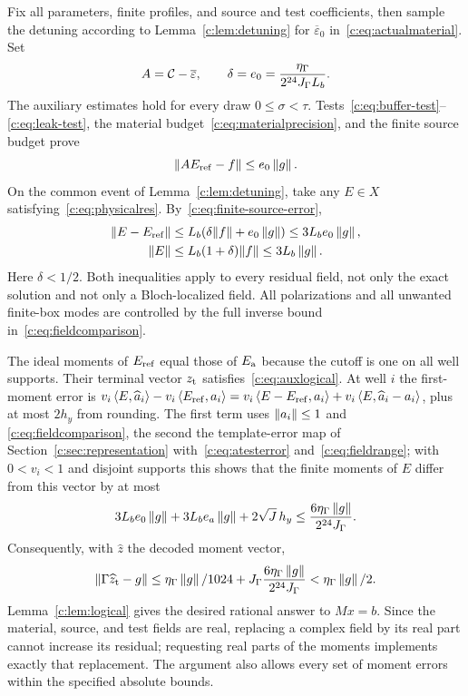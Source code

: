 Fix all parameters, finite profiles, and source and test coefficients,
then sample the detuning according to Lemma~\ref{c:lem:detuning} for
$\overline\varepsilon_0$ in~\eqref{c:eq:actualmaterial}. Set
\begin{equation}
 A=\mathcal C-\overline\varepsilon,
 \qquad \delta=e_0=\frac{\eta_\Gamma}{2^{24}J_\Gamma L_b}.
                                                               \label{c:eq:finaldelta}
\end{equation}
The auxiliary estimates hold for every draw $0\le\sigma<\tau$.
Tests~\eqref{c:eq:buffer-test}--\eqref{c:eq:leak-test}, the material
budget~\eqref{c:eq:materialprecision}, and the finite source budget
prove
\begin{equation}
 \|AE_{\rm ref}-f\|\le e_0\left\lVert g\right\rVert.                          \label{c:eq:comparison-residual}
\end{equation}
On the common event of Lemma~\ref{c:lem:detuning}, take any
$E\in X$ satisfying~\eqref{c:eq:physicalres}. By~\eqref{c:eq:finite-source-error},
\begin{align}
 \|E-E_{\rm ref}\|&\le L_b(\delta\|f\|+e_0\left\lVert g\right\rVert)
                 \le3L_be_0\left\lVert g\right\rVert,                     \label{c:eq:fieldcomparison}\\
 \|E\|&\le L_b(1+\delta)\|f\|\le3L_b\left\lVert g\right\rVert.             \label{c:eq:fieldrange}
\end{align}
Here $\delta<1/2$. Both inequalities apply to every residual field,
not only the exact solution and not only a Bloch-localized field.
All polarizations and all unwanted finite-box modes are controlled
by the full inverse bound in~\eqref{c:eq:fieldcomparison}.

The ideal moments of $E_{\rm ref}$ equal those of $E_{\rm a}$ because
the cutoff is one on all well supports. Their terminal vector $z_{\rm t}$
satisfies~\eqref{c:eq:auxlogical}. At well $i$ the first-moment error is
$v_i\left\langle E,\widehat a_i\right\rangle-v_i\left\langle E_{\rm ref},a_i\right\rangle
=v_i\left\langle E-E_{\rm ref},a_i\right\rangle+v_i\left\langle E,\widehat a_i-a_i\right\rangle$, plus at most
$2h_y$ from rounding. The first term uses $\left\lVert a_i\right\rVert\le1$ and
\eqref{c:eq:fieldcomparison}, the second the template-error map of
Section~\ref{c:sec:representation} with~\eqref{c:eq:atesterror}
and~\eqref{c:eq:fieldrange}; with $0<v_i<1$ and disjoint supports this
shows that the finite moments of $E$ differ from this vector by at most
\[
 3L_be_0\left\lVert g\right\rVert+3L_be_a\left\lVert g\right\rVert+2\sqrt J\,h_y
 \le\frac{6\eta_\Gamma\left\lVert g\right\rVert}{2^{24}J_\Gamma}.
\]
Consequently, with $\widehat z$ the decoded moment vector,
\begin{equation}
 \|\Gamma\widehat z_{\rm t}-g\|
 \le\eta_\Gamma\left\lVert g\right\rVert/1024+J_\Gamma\frac{6\eta_\Gamma\left\lVert g\right\rVert}{2^{24}J_\Gamma}
 <\eta_\Gamma\left\lVert g\right\rVert/2.                                         \label{c:eq:final-logical}
\end{equation}
Lemma~\ref{c:lem:logical} gives the desired rational answer to
$Mx=b$. Since the material, source, and test fields are real,
replacing a complex field by its real part cannot increase its
residual; requesting real parts of the moments implements exactly
that replacement. The argument also allows every set of moment
errors within the specified absolute bounds.

